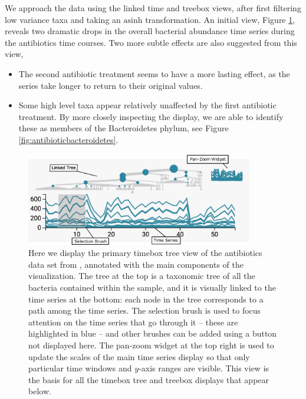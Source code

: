 We approach the data using the linked time and treebox views, after first
filtering low variance taxa and taking an \(\text{asinh}\) transformation. An
initial view, Figure \ref{fig:antibioticoverview}, reveals two dramatic drops in
the overall bacterial abundance time series during the antibiotics time courses.
Two more subtle effects are also suggested from this view,

\begin{itemize}
\item
  The second antibiotic treatment seems to have a more lasting effect,
  as the series take longer to return to their original values.
\item
  Some high level taxa appear relatively unaffected by the first
  antibiotic treatment. By more closely inspecting the display, we are
  able to identify these as members of the Bacteroidetes phylum, see
  Figure \ref{fig:antibioticbacteroidetes}.
\end{itemize}

\begin{figure}
  \centering
  \includegraphics[width=375px]{figure/treelapse/annotated_antibiotic_overview}
  \caption{Here we display the primary timebox tree view of the antibiotics data
    set from \citep{dethlefsen2008pervasive}, annotated with the main components of the
    visualization. The tree at the top is a taxonomic tree of all the bacteria
    contained within the sample, and it is visually linked to the time series at
    the bottom: each node in the tree corresponds to a path among the time series.
    The selection brush is used to focus attention on the time series that go
    through it -- these are highlighted in blue -- and other brushes can be added
    using a button not displayed here. The pan-zoom widget at the top right is
    used to update the scales of the main time series display so that only
    particular time windows and $y$-axis ranges are visible. This view is the
    basis for all the timebox tree and treebox displays that appear
    below. \label{fig:antibioticoverview}}
\end{figure}

